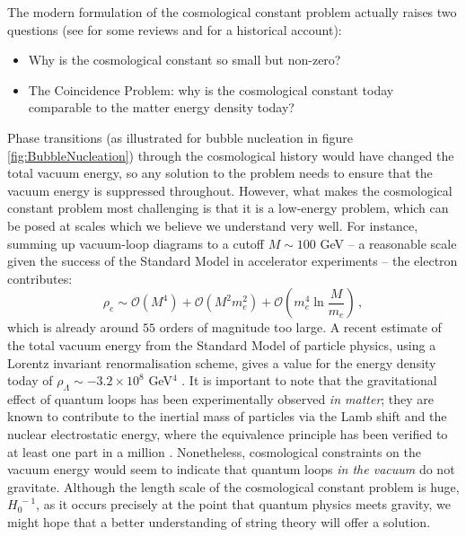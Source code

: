 The modern formulation of the cosmological constant problem actually raises two questions (see  \cite{Weinberg1, Carroll:2000fy, Padmanabhan:2002ji, Martin:2012bt, Li:2012dt, Burgess:2013ara,Padilla:2015aaa} for some reviews and \cite{Straumann:2002tv} for a historical account):
\begin{itemize}
\item Why is the cosmological constant so small but non-zero? 
\item The Coincidence Problem: why is the cosmological constant today comparable to the matter energy density today?
\end{itemize}
Phase transitions (as illustrated for bubble nucleation in figure \ref{fig:BubbleNucleation}) through the cosmological history would have changed the total vacuum energy, so any solution to the problem needs to ensure that the vacuum energy is suppressed throughout.  However, what makes the cosmological constant problem most challenging is that it is a low-energy problem, which can be posed at scales which we believe we understand very well. For instance, summing up vacuum-loop diagrams to a cutoff $M\sim 100$ GeV -- a reasonable scale given the success of the Standard Model in accelerator experiments -- the electron contributes:
\begin{equation}
\rho_e \sim \mathcal{O}\left(M^4\right) + \mathcal{O}\left( M^2 m_e^2 \right) + \mathcal{O}\left( m_e^4\ln \frac{M}{m_e}\right) \,,
\end{equation}
which is already around $55$ orders of magnitude too large. A recent estimate of the total vacuum energy from the Standard Model of particle physics, using a Lorentz invariant renormalisation scheme, gives a value for the energy density today of $\rho_\Lambda \sim -3.2 \times 10^8$ GeV$^4$ \cite{Koksma:2011cq,Martin:2012bt}. It is important to note that the gravitational effect of quantum loops has been experimentally observed \emph{in matter}; they are known to contribute to the inertial mass of particles via the Lamb shift and the nuclear electrostatic energy, where the equivalence principle has been verified to at least one part in a million \cite{Polchinski:2006gy}. Nonetheless, cosmological constraints on the vacuum energy would seem to indicate that quantum loops \emph{in the vacuum} do not gravitate. Although the length scale of the cosmological constant problem is huge, $H_0^{\;-1}$, as it occurs precisely at the point that quantum physics meets gravity, we might hope that a better understanding of string theory will offer a solution.

